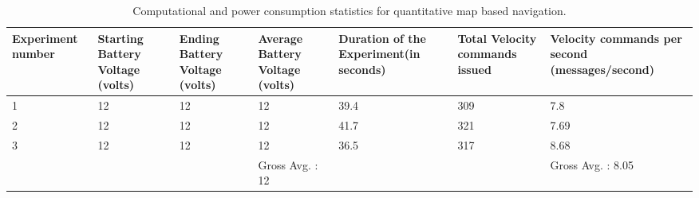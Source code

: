 \newpage

\begin{table}[h!]
	\begin{adjustwidth}{-1cm}{}
	\begin{tabular}{|p{2cm}|p{2cm}|p{2cm}|p{2.5cm}|p{2cm}|p{2cm}|p{2.5cm}|}
		\hline
		Experiment number & Starting Battery Voltage (volts) & Ending Battery Voltage (volts) & Average Battery Voltage (volts) & Duration of the Experiment(in seconds) & Total Velocity commands issued & Velocity commands per second (messages/second) \\ \hline
		1 & 12 & 12 & 12 & 39.4 & 309 & 7.8 \\ \hline
		2 & 12 & 12 & 12 & 41.7 & 321 & 7.69 \\ \hline
		3 & 12 & 12 & 12 & 36.5 & 317 & 8.68 \\ \hline
		&  &  & Gross Avg. : 12 &  &  & Gross Avg. : 8.05 \\ \hline
	\end{tabular}
	\caption{Computational and power consumption statistics for quantitative map based navigation.}
	\label{map based table}
	\end{adjustwidth}
\end{table}


